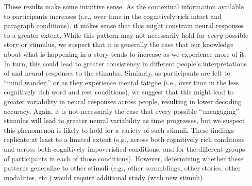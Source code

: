 \documentclass[english, 11pt]{article}
\begin{document}
These results make some intuitive sense. As the contextual information
available to participants increases (i.e., over time in the cognitively rich
intact and paragraph conditions), it makes sense that this might constrain
neural responses to a greater extent. While this pattern may not necessarily
hold for \textit{every} possible story or stimulus, we suspect that it is
generally the case that our knowledge about what is happening in a story tends
to increase as we experience more of it. In turn, this could lead to greater
consistency in different people's interpretations of and neural responses to
the stimulus. Similarly, as participants are left to ``mind wander,'' or as
they experience mental fatigue (i.e., over time in the less cognitively rich
word and rest conditions), we suggest that this might lead to greater
variability in neural responses across people, resulting in lower decoding
accuracy. Again, it is not necessarily the case that every possible
``unengaging'' stimulus will lead to greater neural variability as time
progresses, but we suspect this phenomenon is likely to hold for a variety of
such stimuli. These findings replicate at least to a limited extent (e.g.,
across both cognitively rich conditions and across both cognitively
impoverished conditions, and for the different groups of participants in each
of those conditions). However, determining whether these patterns generalize to
other stimuli (e.g., other scramblings, other stories, other modalities, etc.)
would require additional study (with new stimuli).
\end{document}
